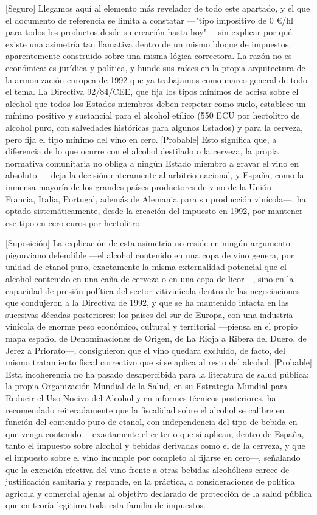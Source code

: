 \documentclass[10pt,a4paper]{article}
\begin{document}
[Seguro] Llegamos aquí al elemento más revelador de todo este apartado, y el que el documento de referencia se limita a constatar —"tipo impositivo de 0 €/hl para todos los productos desde su creación hasta hoy"— sin explicar por qué existe una asimetría tan llamativa dentro de un mismo bloque de impuestos, aparentemente construido sobre una misma lógica correctora. La razón no es económica: es jurídica y política, y hunde sus raíces en la propia arquitectura de la armonización europea de 1992 que ya trabajamos como marco general de todo el tema. La Directiva 92/84/CEE, que fija los tipos mínimos de accisa sobre el alcohol que todos los Estados miembros deben respetar como suelo, establece un mínimo positivo y sustancial para el alcohol etílico (550 ECU por hectolitro de alcohol puro, con salvedades históricas para algunos Estados) y para la cerveza, pero fija el tipo mínimo del vino en cero. [Probable] Esto significa que, a diferencia de lo que ocurre con el alcohol destilado o la cerveza, la propia normativa comunitaria no obliga a ningún Estado miembro a gravar el vino en absoluto — deja la decisión enteramente al arbitrio nacional, y España, como la inmensa mayoría de los grandes países productores de vino de la Unión —Francia, Italia, Portugal, además de Alemania para su producción vinícola—, ha optado sistemáticamente, desde la creación del impuesto en 1992, por mantener ese tipo en cero euros por hectolitro.

[Suposición] La explicación de esta asimetría no reside en ningún argumento pigouviano defendible —el alcohol contenido en una copa de vino genera, por unidad de etanol puro, exactamente la misma externalidad potencial que el alcohol contenido en una caña de cerveza o en una copa de licor—, sino en la capacidad de presión política del sector vitivinícola dentro de las negociaciones que condujeron a la Directiva de 1992, y que se ha mantenido intacta en las sucesivas décadas posteriores: los países del sur de Europa, con una industria vinícola de enorme peso económico, cultural y territorial —piensa en el propio mapa español de Denominaciones de Origen, de La Rioja a Ribera del Duero, de Jerez a Priorato—, consiguieron que el vino quedara excluido, de facto, del mismo tratamiento fiscal correctivo que sí se aplica al resto del alcohol. [Probable] Esta incoherencia no ha pasado desapercibida para la literatura de salud pública: la propia Organización Mundial de la Salud, en su Estrategia Mundial para Reducir el Uso Nocivo del Alcohol y en informes técnicos posteriores, ha recomendado reiteradamente que la fiscalidad sobre el alcohol se calibre en función del contenido puro de etanol, con independencia del tipo de bebida en que venga contenido —exactamente el criterio que sí aplican, dentro de España, tanto el impuesto sobre alcohol y bebidas derivadas como el de la cerveza, y que el impuesto sobre el vino incumple por completo al fijarse en cero—, señalando que la exención efectiva del vino frente a otras bebidas alcohólicas carece de justificación sanitaria y responde, en la práctica, a consideraciones de política agrícola y comercial ajenas al objetivo declarado de protección de la salud pública que en teoría legitima toda esta familia de impuestos.
\end{document}

